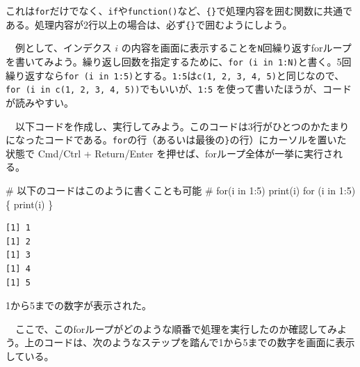 \documentclass[
  a4paper,
  pandoc,
  ja=standard,
  jafont=haranoaji]{bxjsbook}
\newenvironment{Shaded}{\begin{snugshade}}{\end{snugshade}}
\newcommand{\CommentTok}[1]{\textcolor[rgb]{0.37,0.37,0.37}{#1}}
\newcommand{\ControlFlowTok}[1]{\textcolor[rgb]{0.00,0.48,0.65}{#1}}
\newcommand{\DecValTok}[1]{\textcolor[rgb]{0.68,0.00,0.00}{#1}}
\newcommand{\FunctionTok}[1]{\textcolor[rgb]{0.28,0.35,0.67}{#1}}
\newcommand{\NormalTok}[1]{\textcolor[rgb]{0.00,0.48,0.65}{#1}}
\newcommand{\SpecialCharTok}[1]{\textcolor[rgb]{0.37,0.37,0.37}{#1}}
\begin{document}
これは\texttt{for}だけでなく、\texttt{if}や\texttt{function()}など、\texttt{\{\}}で処理内容を囲む関数に共通である。処理内容が2行以上の場合は、必ず\texttt{\{\}}で囲むようにしよう。

　例として、インデクス \(i\)
の内容を画面に表示することを\texttt{N}回繰り返すforループを書いてみよう。繰り返し回数を指定するために、\texttt{for\ (i\ in\ 1:N)}と書く。5回繰り返すなら\texttt{for\ (i\ in\ 1:5)}とする。\texttt{1:5}は\texttt{c(1,\ 2,\ 3,\ 4,\ 5)}と同じなので、\texttt{for\ (i\ in\ c(1,\ 2,\ 3,\ 4,\ 5))}でもいいが、\texttt{1:5}
を使って書いたほうが、コードが読みやすい。

　以下コードを作成し、実行してみよう。このコードは3行がひとつのかたまりになったコードである。\texttt{for}の行（あるいは最後の\texttt{\}}の行）にカーソルを置いた状態で
Cmd/Ctrl + Return/Enter を押せば、forループ全体が一挙に実行される。

\begin{Shaded}
\begin{Highlighting}[numbers=left,,]
\CommentTok{\# 以下のコードはこのように書くことも可能}
\CommentTok{\# for(i in 1:5) print(i)}
\ControlFlowTok{for}\NormalTok{ (i }\ControlFlowTok{in} \DecValTok{1}\SpecialCharTok{:}\DecValTok{5}\NormalTok{) \{}
  \FunctionTok{print}\NormalTok{(i)}
\NormalTok{\}}
\end{Highlighting}
\end{Shaded}

\begin{verbatim}
[1] 1
[1] 2
[1] 3
[1] 4
[1] 5
\end{verbatim}

1から5までの数字が表示された。

　ここで、このforループがどのような順番で処理を実行したのか確認してみよう。上のコードは、次のようなステップを踏んで1から5までの数字を画面に表示している。
\end{document}
